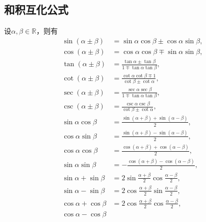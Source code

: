 \subsection{和积互化公式}
\begin{theorem}[和积互化公式]
设\(\alpha,\beta\in\mathbb{R}\)，则有
\begin{align}
	\sin(\alpha\pm\beta)
	&= \sin\alpha\cos\beta\pm\cos\alpha\sin\beta,
	\label{equation:函数.三角函数.和积互化公式1} \\
	\cos(\alpha\pm\beta)
	&= \cos\alpha\cos\beta\mp\sin\alpha\sin\beta,
	\label{equation:函数.三角函数.和积互化公式2} \\
	\tan(\alpha\pm\beta)
	&= \frac{\tan\alpha\pm\tan\beta}{1\mp\tan\alpha\tan\beta},
	\label{equation:函数.三角函数.和积互化公式3} \\
	\cot(\alpha\pm\beta)
	&= \frac{\cot\alpha\cot\beta\mp 1}{\cot\beta\pm\cot\alpha},
	\label{equation:函数.三角函数.和积互化公式4} \\
	\sec(\alpha\pm\beta)
	&= \frac{\sec\alpha\sec\beta}{1\mp\tan\alpha\tan\beta},
	\label{equation:函数.三角函数.和积互化公式5} \\
	\csc(\alpha\pm\beta)
	&= \frac{\csc\alpha\csc\beta}{\cot\beta\pm\cot\alpha},
	\label{equation:函数.三角函数.和积互化公式6} \\
	\sin \alpha \cos \beta
	&= \frac{\sin (\alpha + \beta) + \sin (\alpha - \beta)}{2},
	\label{equation:函数.三角函数.和积互化公式7} \\
	\cos \alpha \sin \beta
	&= \frac{\sin (\alpha + \beta) - \sin (\alpha - \beta)}{2},
	\label{equation:函数.三角函数.和积互化公式8} \\
	\cos \alpha \cos \beta
	&= \frac{\cos (\alpha + \beta) + \cos (\alpha - \beta)}{2},
	\label{equation:函数.三角函数.和积互化公式9} \\
	\sin \alpha \sin \beta
	&= -\frac{\cos (\alpha + \beta) - \cos (\alpha - \beta)}{2},
	\label{equation:函数.三角函数.和积互化公式10} \\
	\sin \alpha + \sin \beta
	&= 2 \sin \frac{\alpha + \beta}{2} \cos \frac{\alpha - \beta}{2},
	\label{equation:函数.三角函数.和积互化公式11} \\
	\sin \alpha - \sin \beta
	&= 2 \cos \frac{\alpha + \beta}{2} \sin \frac{\alpha - \beta}{2},
	\label{equation:函数.三角函数.和积互化公式12} \\
	\cos \alpha + \cos \beta
	&= 2 \cos \frac{\alpha + \beta}{2} \cos \frac{\alpha - \beta}{2},
	\label{equation:函数.三角函数.和积互化公式13} \\
	\cos \alpha - \cos \beta

\end{align}
\end{theorem}
